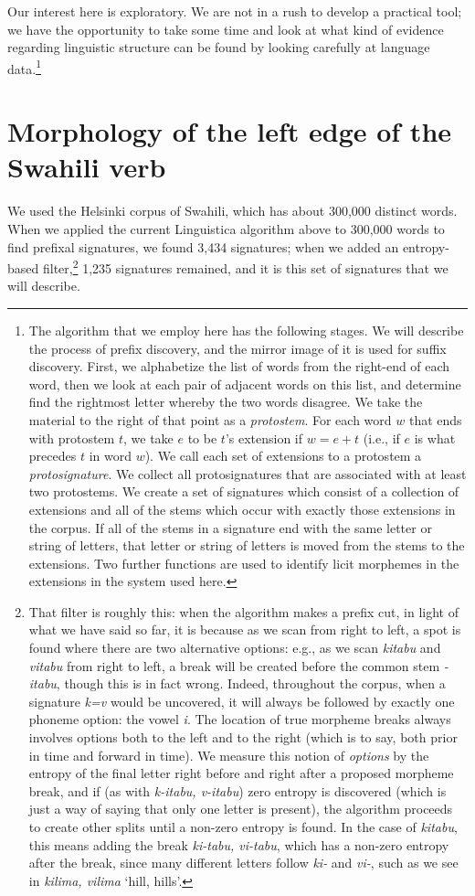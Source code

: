 \documentclass[output=paper,colorlinks,citecolor=brown]{langscibook}
\begin{document}
Our interest here is exploratory. We are not in a rush to develop a practical tool; we have the opportunity to take some time and look at what kind of evidence regarding linguistic structure can be found by looking carefully at language data.\footnote{The algorithm that we employ here has the following stages. We will describe the process of prefix discovery, and the mirror image of it is used for suffix discovery. First, we alphabetize the list of words from the right-end of each word, then we look at each pair of adjacent words on this list, and determine find the rightmost letter whereby the two words disagree. We take the material to the right of that point as a \textit{protostem}. For each word $w$ that ends with protostem $t$, we take $e$ to be $t$'s extension if $w=e+t$ (i.e., if $e$ is what precedes $t$ in word $w$). We call each set of extensions to a protostem a \textit{protosignature}. We collect all protosignatures that are associated with at least two protostems. We create a set of signatures which consist of a collection of extensions and all of the stems which occur with exactly those extensions in the corpus. If all of the stems in a signature end with the same letter or string of letters, that letter or string of letters is moved from the stems to the extensions. Two further functions are used to identify licit morphemes in the extensions in the system used here.}


\section{Morphology of the left edge of the Swahili verb}

We used the Helsinki corpus of Swahili, which has about 300,000 distinct words. When we applied the current Linguistica algorithm above to 300,000 words to find prefixal signatures, we found 3,434 signatures; when we added an entropy-based filter,\footnote{That filter is roughly this: when the algorithm makes a prefix cut, in light of what we have said so far, it is because as we scan from right to left, a spot is found where there are two alternative options: e.g., as we scan \textit{kitabu} and \textit{vitabu} from right to left, a break will be created before the common stem \textit{-itabu}, though this is in fact wrong. Indeed, throughout the corpus, when a signature \textit{k=v} would be uncovered, it will always be followed by exactly one phoneme option: the vowel \textit{i}. The location of true morpheme breaks always involves options both to the left and to the right (which is to say, both prior in time and forward in time). We measure this notion of \textit{options} by the entropy of the final letter right before and right after a proposed morpheme break, and if (as with \textit{k-itabu, v-itabu}) zero entropy is discovered (which is just a way of saying that only one letter is present), the algorithm proceeds to create other splits until a non-zero entropy is found. In the case of \textit{kitabu}, this means adding the break \textit{ki-tabu, vi-tabu}, which has a non-zero entropy after the break, since many different letters follow \textit{ki-} and \textit{vi-}, such as we see in \textit{kilima, vilima} `hill, hills'.}  1,235 signatures remained, and it is this set of signatures that we will describe.  
\end{document}
